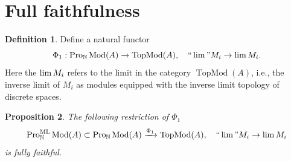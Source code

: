 \documentclass[11pt]{amsart}
\newcommand{\eq}[2]{\begin{equation}\label{#1}#2 \end{equation}}
\newcommand{\ra}{\rightarrow} %
\newcommand{\xra}{\xrightarrow}
\newcommand{\N}{\mathbb{N}}
\newcommand{\Mod}{\operatorname{Mod}}
\newcommand{\ML}{\operatorname{ML}}
\newcommand{\TopMod}{\operatorname{TopMod}}
\renewcommand{\lim}{\operatornamewithlimits{\rm{lim}}}
\newcommand{\Pro}{\operatorname{Pro}}
\theoremstyle{plain}
\newtheorem{prop}{Proposition}[section]
\theoremstyle{definition}
\newtheorem{defn}[prop]{Definition}
\numberwithin{equation}{prop}
\begin{document}
\section{Full faithfulness}


\begin{defn}
Define a natural functor
\eq{Phi1}{\Phi_1:\Pro_\N\Mod(A)\xra{} \TopMod(A),\quad``\lim " M_i\ra \lim M_i.}
Here the $\lim M_i$ refers to the limit in the category $\TopMod(A)$, i.e., the inverse limit of $M_i$ as modules equipped with the inverse limit topology of discrete spaces.
\end{defn}




\begin{prop}\label{Phi1FF}
The following restriction of $\Phi_1$
\eq{{Phi1ML}}{
\Pro^{\ML}_{\N}\Mod(A)\subset \Pro_\N\Mod(A)\xra{\Phi_1} \TopMod(A),\quad``\lim " M_i\ra \lim M_i}
is fully faithful.
\end{prop}
\end{document}
